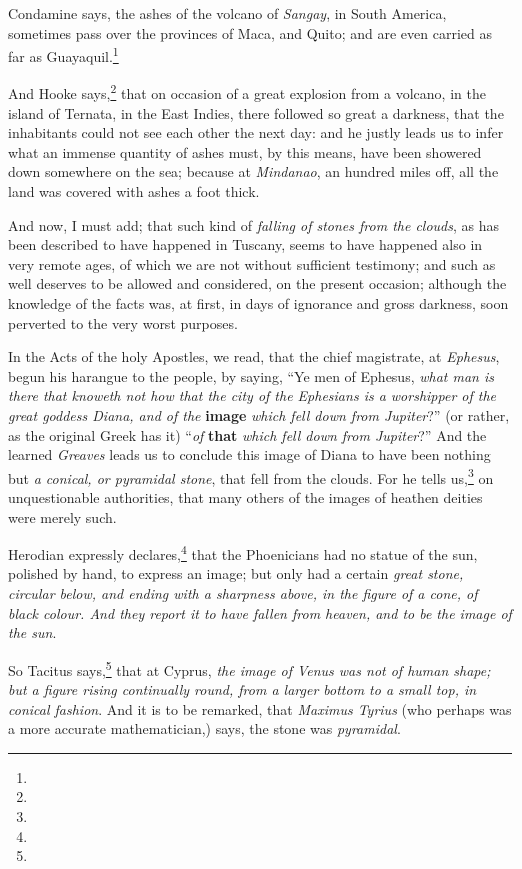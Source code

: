 \documentclass[a4paper, 12pt, oneside]{article}
\begin{document}
Condamine says, the ashes of the volcano of \emph{Sangay}, in South America, sometimes pass over the provinces of Maca, and Quito; and are even carried as far as Guayaquil.\footnote{}

And Hooke says,\footnote{} that on occasion of a great explosion from a volcano, in the island of Ternata, in the East Indies, there followed so great a darkness, that the inhabitants could not see each other the next day: and he justly leads us to infer what an immense quantity of ashes must, by this means, have been showered down somewhere on the sea; because at \emph{Mindanao}, an hundred miles off, all the land was covered with ashes a foot thick.

And now, I must add; that such kind of \emph{falling of stones from the clouds}, as has been described to have happened in Tuscany, seems to have happened also in very remote ages, of which we are not without sufficient testimony; and such as well deserves to be allowed and considered, on the present occasion; although the knowledge of the facts was, at first, in days of ignorance and gross darkness, soon perverted to the very worst purposes.

In the Acts of the holy Apostles, we read, that the chief magistrate, at \emph{Ephesus}, begun his harangue to the people, by saying, ``Ye men of Ephesus, \emph{what man is there that knoweth not how that the city of the Ephesians is a worshipper of the great goddess Diana, and of the} \textbf{image} \emph{which fell down from Jupiter}?'' (or rather, as the original Greek has it) ``\emph{of} \textbf{that} \emph{which fell down from Jupiter}?'' And the learned \emph{Greaves} leads us to conclude this image of Diana to have been nothing but \emph{a conical, or pyramidal stone}, that fell from the clouds. For he tells us,\footnote{} on unquestionable authorities, that many others of the images of heathen deities were merely such.

Herodian expressly declares,\footnote{} that the Phoenicians had no statue of the sun, polished by hand, to express an image; but only had a certain \emph{great stone, circular below, and ending with a sharpness above, in the figure of a cone, of black colour. And they report it to have fallen from heaven, and to be the image of the sun}.

So Tacitus says,\footnote{} that at Cyprus, \emph{the image of Venus was not of human shape; but a figure rising continually round, from a larger bottom to a small top, in conical fashion}. And it is to be remarked, that \emph{Maximus Tyrius} (who perhaps was a more accurate mathematician,) says, the stone was \emph{pyramidal}.
\end{document}
